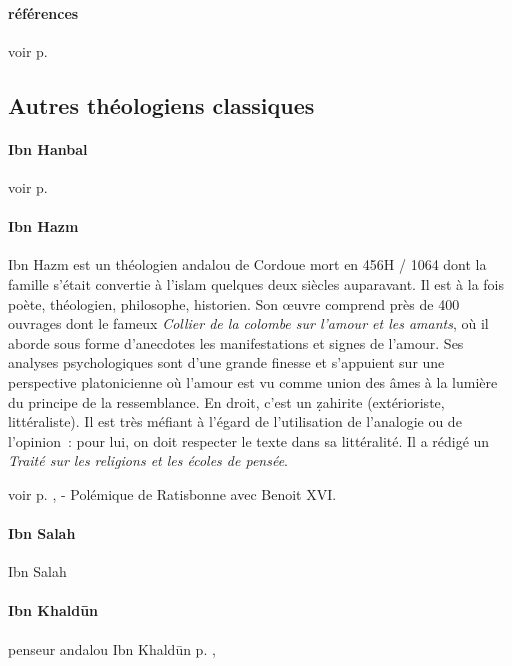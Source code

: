 \paragraph{références}
voir p. 


\subsection{Autres théologiens classiques}

\paragraph{Ibn Hanbal}

voir p. \pageref{Theol:IbnHanbal1}


 \paragraph{Ibn Hazm} \label{Theol:IbnHazm}{Ibn Hazm est un théologien andalou de Cordoue mort en 456H / 1064 dont
la famille s'était convertie à l'islam quelques deux siècles auparavant.
Il est à la fois poète, théologien, philosophe, historien. Son œuvre
comprend près de 400 ouvrages dont le fameux \emph{Collier de la colombe
sur l'amour et les amants}, où il aborde sous forme d'anecdotes les
manifestations et signes de l'amour. Ses analyses psychologiques sont
d'une grande finesse et s'appuient sur une perspective platonicienne où
l'amour est vu comme union des âmes à la lumière du principe de la
ressemblance. En droit, c'est un ẓahirite (extérioriste, littéraliste).
Il est très méfiant à l'égard de l'utilisation de l'analogie ou de
l'opinion~: pour lui, on doit respecter le texte dans sa littéralité. Il
a rédigé un \emph{Traité sur les religions et les écoles de pensée}. }

voir p. \pageref{Theol:IbnHazm1}, \pageref{Theol:IbnHazm2} - Polémique de Ratisbonne avec Benoit XVI.
\paragraph{Ibn Salah}
Ibn Salah
\pageref{Ibnsalah1}
\paragraph{Ibn Khaldūn} \label{Theol:IbnKhaldun} penseur andalou Ibn Khaldūn p. \pageref{theol:IbnKhaldun}, \pageref{Theol:IbnKhaldun2}
